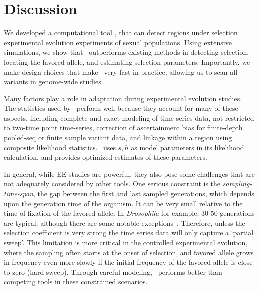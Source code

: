 \documentclass[11pt]{article}
\def\comale{\text{{\sc Comale}}}
\begin{document}
\section{Discussion}

We developed a computational tool \comale, that can detect regions
under selection experimental evolution experiments of sexual
populations. Using extensive simulations, we show that \comale\
outperforms existing methods in detecting selection, locating the
favored allele, and estimating selection parameters. Importantly, we
make design choices that make \comale\ very fast in practice, allowing
us to scan all variants in genome-wide studies.


Many factors play a role in adaptation during experimental evolution
studies. The statistics used by \comale\ perform well because they
account for many of these aspects, including complete and exact
modeling of time-series data, not restricted to two-time point
time-series, correction of ascertainment bias for finite-depth
pooled-seq or finite sample variant data, and linkage within a region
using composite likelihood statistics. \comale\ uses $s,h$ as model
parameters in its likelihood calculation, and provides optimized
estimates of these parameters.

In general, while EE studies are powerful, they also pose some
challenges that are not adequately considered by other tools. One
serious constraint is the \emph{sampling-time-span}, the gap between
the first and last sampled generations, which depends upon the
generation time of the organism. It can be very small relative to the
time of fixation of the favored allele. In \emph{Drosophila} for
example, $30$-$50$ generations are typical, although there are some
notable exceptions~\cite{zhou2011experimental}.  Therefore, unless the
selection coefficient is very strong the time series data will only
capture a `partial sweep'.  This limitation is more critical in the
controlled experimental evolution, where the sampling often starts at
the onset of selection, and favored allele grows in frequency even
more slowly if the initial frequency of the favored allele is close to
zero (hard sweep). Through careful modeling, \comale\ performs better
than competing tools in these constrained scenarios.
\end{document}
